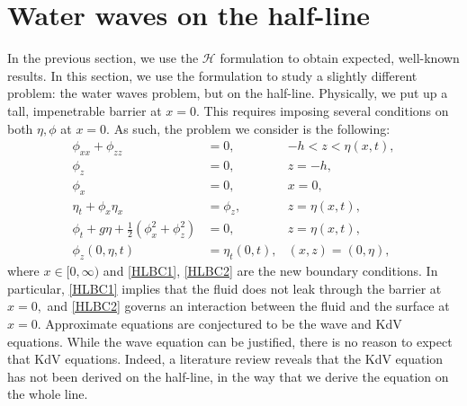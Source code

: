 
\chapter{Water waves on the half-line} %

\label{Chapter5} %

In the previous section, we use the $\mathcal{H}$ formulation to obtain expected, well-known results. In this section, we use the formulation to study a slightly different problem: the water waves problem, but on the half-line. Physically, we put up a tall, impenetrable barrier at $x = 0.$ This requires imposing several conditions on both $\eta, \phi$ at $x = 0.$ As such, the problem we consider is the following:
\begin{subequations}\label{DimHalfLineProblem}
\begin{align}
\phi_{xx} + \phi_{zz} &= 0, &-h < z < \eta(x,t), \\
\phi_{z} &= 0, &z = -h, \\
\phi_{x} &= 0, &x =0, \label{HLBC1}\\
\eta_t + \phi_{x}\eta_{x} &= \phi_{z}, & z = \eta(x,t), \\
\phi_t + g\eta + \frac{1}{2}(\phi_{x}^2 + \phi_{z}^2) &= 0, &z = \eta(x,t), \\
\phi_{z}(0,\eta,t) &= \eta_t(0,t), &(x,z) = (0,\eta), \label{HLBC2}
\end{align}
\end{subequations}
where $x\in[0,\infty)$ and \eqref{HLBC1}, \eqref{HLBC2} are the new boundary conditions. In particular, \eqref{HLBC1} implies that the fluid does not leak through the barrier at $x=0,$ and \eqref{HLBC2} governs an interaction between the fluid and the surface at $x = 0.$ Approximate equations are conjectured to be the wave and KdV equations. While the wave equation can be justified, there is no reason to expect that KdV equations. Indeed, a literature review reveals that the KdV equation has not been derived on the half-line, in the way that we derive the equation on the whole line. 

